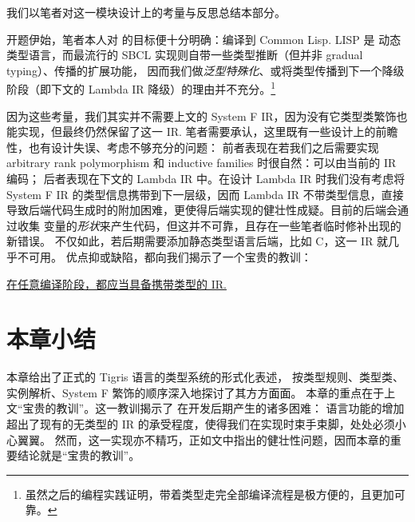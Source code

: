 我们以笔者对这一模块设计上的考量与反思总结本部分。
\begin{remark}
  开题伊始，笔者本人对 \Tigris 的目标便十分明确：编译到 Common Lisp. LISP 是
  动态类型语言，而最流行的 SBCL 实现则自带一些类型推断（但并非 gradual typing）、传播的扩展功能，
  因而我们做\emph{泛型特殊化}、或将类型传播到下一个降级阶段（即下文的 Lambda IR 降级）的理由并不充分。\footnote{
    虽然之后的编程实践证明，带着类型走完全部编译流程是极方便的，且更加可靠。
  }

  因为这些考量，我们其实并不需要上文的 System F IR，因为没有它类型类繁饰也能实现，但最终仍然保留了这一 IR.
  笔者需要承认，这里既有一些设计上的前瞻性，也有设计失误、考虑不够充分的问题：
  前者表现在若我们之后需要实现 arbitrary rank polymorphism 和 inductive families 时很自然：可以由当前的 IR 编码；
  后者表现在下文的 Lambda IR 中。在设计 Lambda IR 时我们没有考虑将 System F IR 的类型信息携带到下一层级，因而
  Lambda IR 不带类型信息，直接导致后端代码生成时的附加困难，更使得后端实现的健壮性成疑。目前的后端会通过收集
  变量的\emph{形状}来产生代码，但这并不可靠，且存在一些笔者临时修补出现的新错误。
  不仅如此，若后期需要添加静态类型语言后端，比如 C，这一 IR 就几乎不可用。
  优点抑或缺陷，都向我们揭示了一个宝贵的教训：
  \begin{center}
    \underline{在任意编译阶段，都应当具备携带类型的 IR.}
  \end{center}
\end{remark}

\section{本章小结}
本章给出了正式的 Tigris 语言的类型系统的形式化表述，
按类型规则、类型类、实例解析、System F 繁饰的顺序深入地探讨了其方方面面。
本章的重点在于上文“宝贵的教训”。这一教训揭示了 \Tigris 在开发后期产生的诸多困难：
语言功能的增加超出了现有的无类型的 IR 的承受程度，使得我们在实现时束手束脚，处处必须小心翼翼。
然而，这一实现亦不精巧，正如文中指出的健壮性问题，因而本章的重要结论就是“宝贵的教训”。